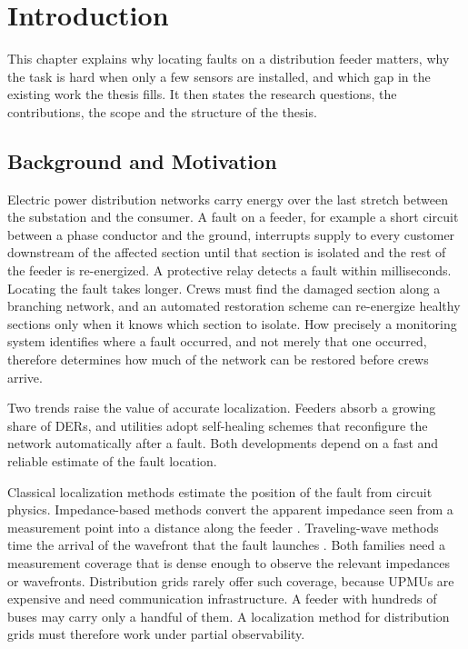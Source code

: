 \documentclass[MTech]{ugthesis}
\begin{document}

\chapter{Introduction}
\label{chap:intro}

This chapter explains why locating faults on a distribution feeder matters, why the task is hard when only a few sensors are installed, and which gap in the existing work the thesis fills. It then states the research questions, the contributions, the scope and the structure of the thesis.

\section{Background and Motivation}

Electric power distribution networks carry energy over the last stretch between the substation and the consumer. A fault on a feeder, for example a short circuit between a phase conductor and the ground, interrupts supply to every customer downstream of the affected section until that section is isolated and the rest of the feeder is re-energized. A protective relay detects a fault within milliseconds. Locating the fault takes longer. Crews must find the damaged section along a branching network, and an automated restoration scheme can re-energize healthy sections only when it knows which section to isolate. How precisely a monitoring system identifies where a fault occurred, and not merely that one occurred, therefore determines how much of the network can be restored before crews arrive.

Two trends raise the value of accurate localization. Feeders absorb a growing share of \acp{DER}, and utilities adopt self-healing schemes that reconfigure the network automatically after a fault. Both developments depend on a fast and reliable estimate of the fault location.

Classical localization methods estimate the position of the fault from circuit physics. Impedance-based methods convert the apparent impedance seen from a measurement point into a distance along the feeder \citep{krishnathevar2012}. Traveling-wave methods time the arrival of the wavefront that the fault launches \citep{liu2023}. Both families need a measurement coverage that is dense enough to observe the relevant impedances or wavefronts. Distribution grids rarely offer such coverage, because \acp{UPMU} are expensive and need communication infrastructure. A feeder with hundreds of buses may carry only a handful of them. A localization method for distribution grids must therefore work under partial observability.
\end{document}
